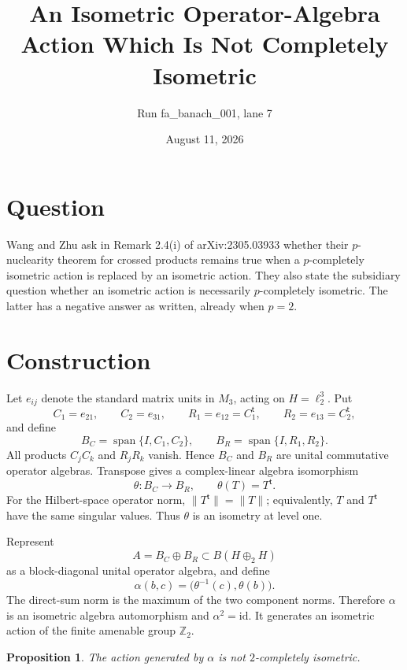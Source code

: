 \documentclass[11pt]{article}
\title{An Isometric Operator-Algebra Action Which Is Not Completely Isometric}
\author{Run fa\_banach\_001, lane 7}
\date{August 11, 2026}
\newtheorem{proposition}{Proposition}
\begin{document}
\maketitle

\section{Question}

Wang and Zhu ask in Remark 2.4(i) of arXiv:2305.03933 whether their
$p$-nuclearity theorem for crossed products remains true when a
$p$-completely isometric action is replaced by an isometric action.  They
also state the subsidiary question whether an isometric action is necessarily
$p$-completely isometric.  The latter has a negative answer as written,
already when $p=2$.

\section{Construction}

Let $e_{ij}$ denote the standard matrix units in $M_3$, acting on
$H=\ell_2^3$.  Put
\[
 C_1=e_{21},\qquad C_2=e_{31},\qquad
 R_1=e_{12}=C_1^{\mathsf t},\qquad
 R_2=e_{13}=C_2^{\mathsf t},
\]
and define
\[
 B_C=\operatorname{span}\{I,C_1,C_2\},\qquad
 B_R=\operatorname{span}\{I,R_1,R_2\}.
\]
All products $C_jC_k$ and $R_jR_k$ vanish.  Hence $B_C$ and $B_R$ are
unital commutative operator algebras.  Transpose gives a complex-linear
algebra isomorphism
\[
 \theta:B_C\longrightarrow B_R,\qquad \theta(T)=T^{\mathsf t}.
\]
For the Hilbert-space operator norm, $\|T^{\mathsf t}\|=\|T\|$; equivalently,
$T$ and $T^{\mathsf t}$ have the same singular values.  Thus $\theta$ is an
isometry at level one.

Represent
\[
 A=B_C\oplus B_R
 \subset B(H\oplus_2H)
\]
as a block-diagonal unital operator algebra, and define
\[
 \alpha(b,c)=\big(\theta^{-1}(c),\theta(b)\big).
\]
The direct-sum norm is the maximum of the two component norms.  Therefore
$\alpha$ is an isometric algebra automorphism and $\alpha^2=\mathrm{id}$.
It generates an isometric action of the finite amenable group $\mathbb Z_2$.

\begin{proposition}
The action generated by $\alpha$ is not $2$-completely isometric.
\end{proposition}
\end{document}
